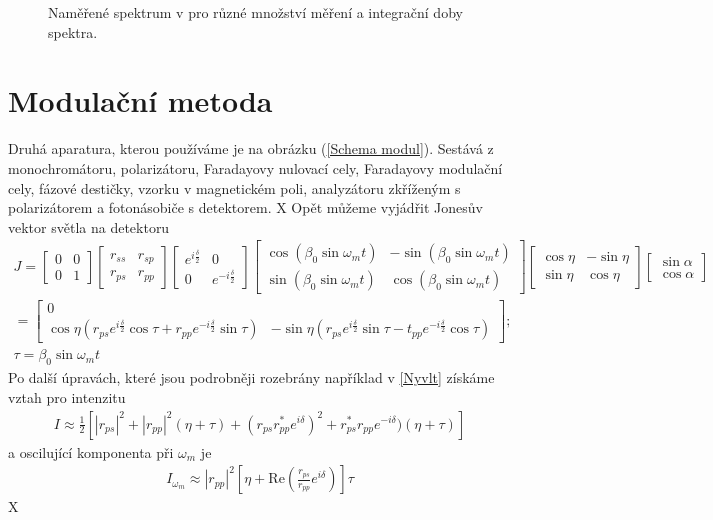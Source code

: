 \begin{figure}

\caption{Naměřené spektrum v pro různé množství měření a integrační doby spektra.}
\label{TPE3}
\end{figure}


\section{Modulační metoda}
Druhá aparatura, kterou používáme je na obrázku (\ref{Schema modul}). Sestává z monochromátoru, polarizátoru, Faradayovy nulovací cely, Faradayovy modulační cely, fázové destičky, vzorku v magnetickém poli, analyzátoru zkříženým s polarizátorem a fotonásobiče s detektorem. 
X %
Opět můžeme vyjádřit Jonesův vektor světla na detektoru
\begin{eqnarray}
J=\begin{bmatrix}0&0\\0&1\end{bmatrix}
\begin{bmatrix}r_{ss}&r_{sp}\\r_{ps}& r_{pp}\end{bmatrix}
\begin{bmatrix}e^{i\frac{\delta}{2}}&0\\0&e^{-i\frac{\delta}{2}}\end{bmatrix}
\begin{bmatrix}\cos(\beta_0\sin\omega_mt) & -\sin(\beta_0\sin\omega_mt) \\ \sin(\beta_0\sin\omega_mt)&\cos(\beta_0\sin\omega_mt)\end{bmatrix}
\begin{bmatrix}\cos\eta&-\sin\eta\\\sin\eta&\cos\eta\end{bmatrix}
\begin{bmatrix}\sin\alpha\\\cos\alpha\end{bmatrix} \\
=\begin{bmatrix}0\\\cos\eta(r_{ps}e^{i\frac{\delta}{2}}\cos\tau+r_{pp}e^{-i\frac{\delta}{2}}\sin\tau)& -\sin\eta(r_{ps}e^{i\frac{\delta}{2}}\sin\tau-t_{pp}e^{-i\frac{\delta}{2}}\cos\tau)\end{bmatrix};\\ \tau = \beta_0\sin\omega_mt
\end{eqnarray}
Po další úpravách, které jsou podrobněji rozebrány například v \ref{Nyvlt} získáme vztah pro intenzitu
\begin{eqnarray}
I\approx\frac{1}{2}\left[|r_{ps}|^2+|r_{pp}|^2(\eta+\tau)+(r_{ps}r^*_{pp}e^{i\delta})^2+r^*_{ps}r_{pp}e^{-i\delta})(\eta+\tau)\right]
\end{eqnarray}
a oscilující komponenta při $\omega_m$ je
\begin{eqnarray}
I_{\omega_m}\approx|r_{pp}|^2\left[\eta+\mbox{Re}\left(\frac{r_{ps}}{r_{pp}}e^{i\delta}\right)\right]\tau
\end{eqnarray}
X %




